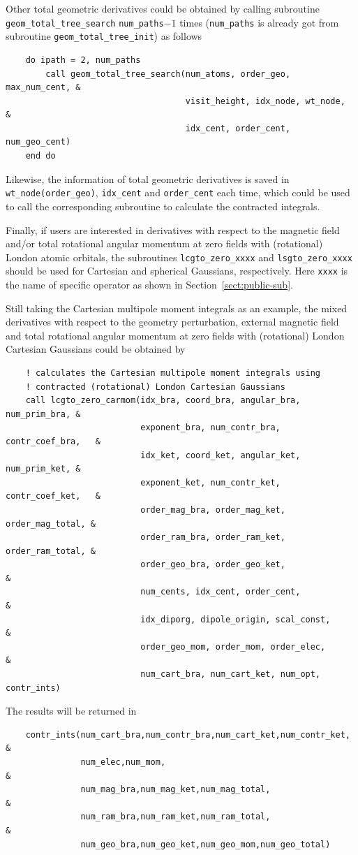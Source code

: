 \documentclass[a4paper,11pt,twoside,openright]{book}
\begin{document}
Other total geometric derivatives could be obtained by calling subroutine
\verb|geom_total_tree_search| \verb|num_paths|$-1$ times (\verb|num_paths| is already
got from subroutine \verb|geom_total_tree_init|) as follows
\begin{verbatim}
    do ipath = 2, num_paths
        call geom_total_tree_search(num_atoms, order_geo, max_num_cent, &
                                    visit_height, idx_node, wt_node,    &
                                    idx_cent, order_cent, num_geo_cent)
    end do
\end{verbatim}
Likewise, the information of total geometric derivatives is saved in \verb|wt_node(order_geo)|,
\verb|idx_cent| and \verb|order_cent| each time, which could be used to call the corresponding
subroutine to calculate the contracted integrals.

Finally, if users are interested in derivatives with respect to the magnetic field and/or total rotational
angular momentum at zero fields with (rotational) London atomic orbitals, the subroutines
\verb|lcgto_zero_xxxx| and \verb|lsgto_zero_xxxx| should be used for Cartesian and spherical
Gaussians, respectively. Here \verb|xxxx| is the name of specific operator as shown in
Section~\ref{sect:public-sub}.

Still taking the Cartesian multipole moment integrals as an example, the mixed derivatives with
respect to the geometry perturbation, external magnetic field and total rotational angular
momentum at zero fields with (rotational) London Cartesian Gaussians could be obtained
by
\begin{verbatim}
    ! calculates the Cartesian multipole moment integrals using
    ! contracted (rotational) London Cartesian Gaussians
    call lcgto_zero_carmom(idx_bra, coord_bra, angular_bra, num_prim_bra, &
                           exponent_bra, num_contr_bra, contr_coef_bra,   &
                           idx_ket, coord_ket, angular_ket, num_prim_ket, &
                           exponent_ket, num_contr_ket, contr_coef_ket,   &
                           order_mag_bra, order_mag_ket, order_mag_total, &
                           order_ram_bra, order_ram_ket, order_ram_total, &
                           order_geo_bra, order_geo_ket,                  &
                           num_cents, idx_cent, order_cent,               &
                           idx_diporg, dipole_origin, scal_const,         &
                           order_geo_mom, order_mom, order_elec,          &
                           num_cart_bra, num_cart_ket, num_opt, contr_ints)
\end{verbatim}
The results will be returned in
\begin{verbatim}
    contr_ints(num_cart_bra,num_contr_bra,num_cart_ket,num_contr_ket, &
               num_elec,num_mom,                                      &
               num_mag_bra,num_mag_ket,num_mag_total,                 &
               num_ram_bra,num_ram_ket,num_ram_total,                 &
               num_geo_bra,num_geo_ket,num_geo_mom,num_geo_total)
\end{verbatim}
\end{document}
